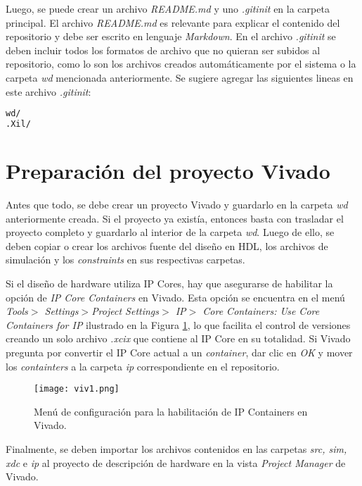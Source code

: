 	Luego, se puede crear un archivo \textit{README.md} y uno \textit{.gitinit} en la carpeta principal. El archivo \textit{README.md} es relevante para explicar el contenido del repositorio y debe ser escrito en lenguaje \textit{Markdown}. En el archivo \textit{.gitinit} se deben incluir todos los formatos de archivo que no quieran ser subidos al repositorio, como lo son los archivos creados automáticamente por el sistema o la carpeta \textit{wd} mencionada anteriormente. Se sugiere agregar las siguientes lineas en este archivo \textit{.gitinit}:

\begin{lstlisting}[language=bash, frame=single]
wd/
.Xil/
\end{lstlisting}

\section{Preparación del proyecto Vivado}
	Antes que todo, se debe crear un proyecto Vivado y guardarlo en la carpeta \textit{wd} anteriormente creada. Si el proyecto ya existía, entonces basta con trasladar el proyecto completo y guardarlo al interior de la carpeta \textit{wd}. Luego de ello, se deben copiar o crear los archivos fuente del diseño en HDL, los archivos de simulación y los \textit{constraints} en sus respectivas carpetas.
	
	Si el diseño de hardware utiliza IP Cores, hay que asegurarse de habilitar la opción de \textit{IP Core Containers} en Vivado. Esta opción se encuentra en el menú \textit{Tools$>$ Settings$> $Project Settings$>$ IP$>$ Core Containers: Use Core Containers for IP} ilustrado en la Figura \ref{fig:viv1}, lo que facilita el control de versiones creando un solo archivo \textit{.xcix} que contiene al IP Core en su totalidad. Si Vivado pregunta por convertir el IP Core actual a un \textit{container}, dar clic en \textit{OK} y mover los \textit{containters} a la carpeta \textit{ip} correspondiente en el repositorio.
	
	\begin{figure}[ht]
		\centering
		\texttt{[image: viv1.png]}
		\caption{Menú de configuración para la habilitación de IP Containers en Vivado.}
		\label{fig:viv1}
	\end{figure}
	
	Finalmente, se deben importar los archivos contenidos en las carpetas \textit{src, sim, xdc} e \textit{ip} al proyecto de descripción de hardware en la vista \textit{Project Manager} de Vivado.

